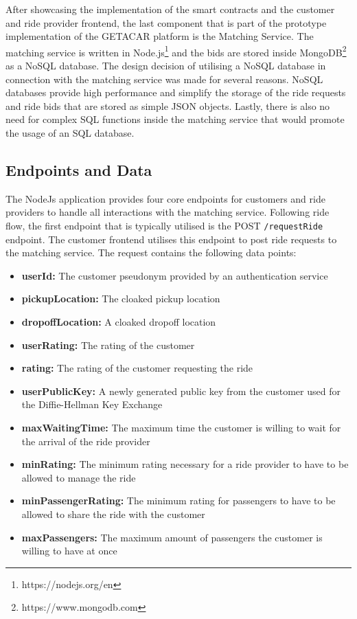 After showcasing the implementation of the smart contracts and the customer and ride provider frontend, the last component that is part of the prototype implementation of the GETACAR platform is the Matching Service. The matching service is written in Node.js\footnote{https://nodejs.org/en} and the bids are stored inside MongoDB\footnote{https://www.mongodb.com} as a NoSQL database. The design decision of utilising a NoSQL database in connection with the matching service was made for several reasons. NoSQL databases provide high performance and simplify the storage of the ride requests and ride bids that are stored as simple JSON objects. Lastly, there is also no need for complex SQL functions inside the matching service that would promote the usage of an SQL database.


\subsection{Endpoints and Data}
The NodeJs application provides four core endpoints for customers and ride providers to handle all interactions with the matching service. Following ride flow, the first endpoint that is typically utilised is the POST \texttt{/requestRide} endpoint. The customer frontend utilises this endpoint to post ride requests to the matching service. The request contains the following data points:

\begin{itemize}
    \item \textbf{userId:} The customer pseudonym provided by an authentication service
    \item \textbf{pickupLocation:} The cloaked pickup location
    \item \textbf{dropoffLocation:} A cloaked dropoff location
    \item \textbf{userRating:} The rating of the customer
    \item \textbf{rating:} The rating of the customer requesting the ride
    \item \textbf{userPublicKey:} A newly generated public key from the customer used for the Diffie-Hellman Key Exchange
    \item \textbf{maxWaitingTime:} The maximum time the customer is willing to wait for the arrival of the ride provider
    \item \textbf{minRating:} The minimum rating necessary for a ride provider to have to be allowed to manage the ride
    \item \textbf{minPassengerRating:} The minimum rating for passengers to have to be allowed to share the ride with the customer
    \item \textbf{maxPassengers:} The maximum amount of passengers the customer is willing to have at once
\end{itemize}

